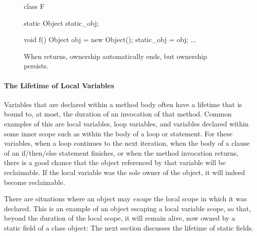 \begin{figure}
\centering
\vspace{-2mm}
\begin{framedlisting}
class F {
  static Object static_obj;
   
  void f() {
    Object obj = new Object();
    static_obj = obj;
    ...
  }
}
\end{framedlisting}
\caption{When  returns,  ownership automatically ends, but
 ownership persists.}
\end{figure}
\paragraph{The Lifetime of Local Variables}
\label{sec:lifetime-of-locals}
Variables that are declared within a method body often have a lifetime that is
bound to, at most, the duration of an invocation of that method.
Common examples of this are local variables, loop variables, and variables
declared within some inner scope such as within the body of a loop or 
statement. For these variables, when a loop continues to the next iteration,
when the body of a clause of an if/then/else statement finishes, or when the
method invocation returns, there is a good chance that the object referenced by
that variable will be reclaimable. If the local variable was the sole owner of
the object, it will indeed become reclaimable.

There are situations where an object may \emph{escape} the local scope in which
it was declared.
This is an example of an object escaping a local variable scope, so that, beyond
the duration of the local scope, it will remain alive, now owned by a static
field of a class object:
The next section discusses the lifetime
of static fields.

